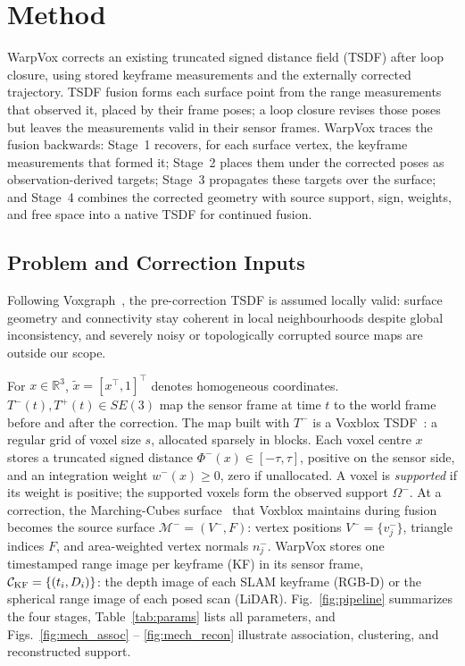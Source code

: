 \section{Method}
\label{sec:method}

WarpVox corrects an existing truncated signed distance field (TSDF) after
loop closure, using stored keyframe measurements and the externally
corrected trajectory. TSDF fusion forms each surface point from the range
measurements that observed it, placed by their frame poses; a loop
closure revises those poses but leaves the measurements valid in their
sensor frames. WarpVox traces the fusion backwards: Stage~1 recovers, for
each surface vertex, the keyframe measurements that formed it; Stage~2
places them under the corrected poses as observation-derived targets; Stage~3 propagates these targets over the surface; and Stage~4
combines the corrected geometry with source support, sign, weights, and
free space into a native TSDF for continued fusion.

\subsection{Problem and Correction Inputs}
\label{sec:problem}

Following Voxgraph~\cite{reijgwart2020voxgraph}, the pre-correction TSDF is
assumed locally valid: surface geometry and connectivity stay coherent in
local neighbourhoods despite global inconsistency, and severely noisy or
topologically corrupted source maps are outside our scope.

For $x\in\mathbb R^3$, $\widetilde x=[x^\top,1]^\top$ denotes homogeneous
coordinates. $T^-(t),T^+(t)\in SE(3)$ map the sensor frame at time $t$ to the
world frame before and after the correction.
The map built with $T^-$ is a Voxblox TSDF~\cite{Oleynikova_2017}: a regular
grid of voxel size $s$, allocated sparsely in blocks. Each voxel centre $x$
stores a truncated signed distance $\Phi^-(x)\in[-\tau,\tau]$, positive on the
sensor side, and an integration weight $w^-(x)\ge0$, zero if unallocated. A
voxel is \emph{supported} if its weight is positive; the supported voxels
form the observed support $\Omega^-$.
At a correction, the Marching-Cubes surface~\cite{10.1145/37402.37422} that
Voxblox maintains during fusion becomes the source surface
$\mathcal M^-=(V^-,F)$: vertex positions $V^-=\{v_j^-\}$, triangle indices
$F$, and area-weighted vertex normals $n_j^-$.
WarpVox stores one timestamped range image per keyframe (KF) in its sensor
frame, $\mathcal C_{\rm KF}=\{(t_i,D_i)\}$: the depth image of each SLAM
keyframe (RGB-D) or the spherical range image of each posed scan (LiDAR).
Fig.~\ref{fig:pipeline} summarizes the four stages,
Table~\ref{tab:params} lists all parameters, and
Figs.~\ref{fig:mech_assoc} -- \ref{fig:mech_recon} illustrate association,
clustering, and reconstructed support.

